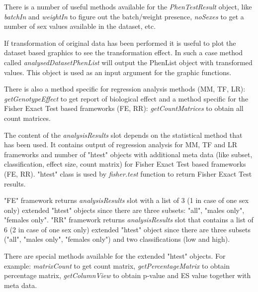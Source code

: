 \documentclass[12pt,a4paper]{article}
\begin{document}
There is a number of useful methods available for the \textit{PhenTestResult} object, like \textit{batchIn} and \textit{weightIn} to figure out the batch/weight presence, \textit{noSexes} to get a number of sex values available in the dataset, etc.


If transformation of original data has been performed it is useful to plot the dataset based graphics to see the transformation effect. In such a case method called \textit{analysedDatasetPhenList} will output the PhenList object with transformed values. This object is used as an input argument for the graphic functions.

There is also a method specific for regression analysis methods (MM, TF, LR): \textit{getGenotypeEffect} to get report of biological effect and a method specific for the Fisher Exact Test based frameworks (FE, RR): \textit{getCountMatrices} to obtain all count matrices.

The content of the \textit{analysisResults} slot depends on the statistical method that has been used. It contains output of regression analysis for MM, TF and LR frameworks and number of "htest" objects with additional meta data (like subset, classification, effect size, count matrix) for  
Fisher Exact Test based frameworks (FE, RR). "htest" class  is used by \textit{fisher.test} function to return Fisher Exact Test results.

"FE" framework returns \textit{analysisResults} slot with  a list of 3 (1 in case of one sex only) extended "htest" objects since there are three subsets: "all", "males only", "females only".
"RR" framework returns \textit{analysisResults} slot that contains a list of 6 (2 in case of one sex only) extended "htest" object since there are three subsets ("all", "males only", "females only") and two classifications (low and high).

There are special methods available for the extended "htest" objects. For example: \textit{matrixCount} to get count matrix, \textit{getPercentageMatrix} to obtain percentage matrix, \textit{getColumnView} to obtain p-value and ES value together with meta data.
\end{document}
